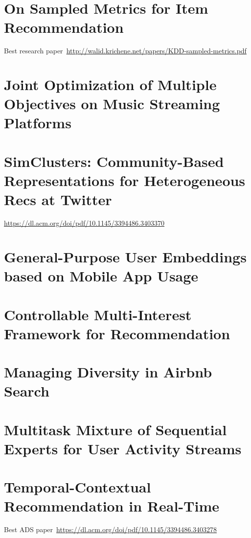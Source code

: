 \begin{bibunit}[plainnat]

\chapter{On Sampled Metrics for Item Recommendation}
Best research paper~\url{http://walid.krichene.net/papers/KDD-sampled-metrics.pdf}

\chapter{Joint Optimization of Multiple Objectives on Music Streaming Platforms}
\cite{rishabh2020multiobjective}

\chapter{SimClusters: Community-Based Representations for Heterogeneous Recs at Twitter}
\url{https://dl.acm.org/doi/pdf/10.1145/3394486.3403370}

\chapter{General-Purpose User Embeddings based on Mobile App Usage}
\cite{zhang2020general}

\chapter{Controllable Multi-Interest Framework for Recommendation}

\chapter{Managing Diversity in Airbnb Search}
\cite{abdool2020managing}

\chapter{Multitask Mixture of Sequential Experts for User Activity Streams}

\chapter{Temporal-Contextual Recommendation in Real-Time}
Best ADS paper~\url{https://dl.acm.org/doi/pdf/10.1145/3394486.3403278}

\end{bibunit}
